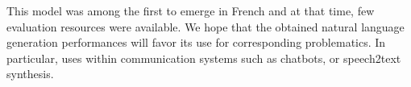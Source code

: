 This model was among the first to emerge in French and at that time, few evaluation resources were available. We hope that the obtained natural language generation performances will favor its use for corresponding problematics. In particular, uses within communication systems such as chatbots, or speech2text synthesis.



